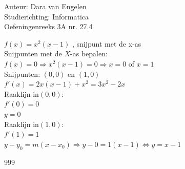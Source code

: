 \documentclass[a4paper]{article}
\begin{document}
  
\noindent \large Auteur: Dara van Engelen\\
\noindent \large Studierichting: Informatica\\
\noindent \large Oefeningenreeks 3A nr. 27.4\\

\medskip

\normalsize

$f(x) = x^2(x-1)$ , snijpunt met de x-as\\

Snijpunten met de $X$-as bepalen:\\

$f(x) = 0 \Rightarrow x^2(x-1) = 0 \Rightarrow x = 0$ of $ x= 1$\\

Snijpunten: $(0,0)$ en $(1,0)$\\

$f'(x) = 2x(x-1) + x^2 = 3x^2 -2x$\\

Raaklijn in$(0,0)$:\\

$f'(0) = 0$\\

$y = 0$\\

Raaklijn in$(1,0)$:\\

$f'(1) = 1$\\

$y-y_0 = m(x-x_0) \Rightarrow y -0 = 1(x-1) \Leftrightarrow y = x-1$\\


\begin{thebibliography}{999}
\end{thebibliography}
\end{document}
